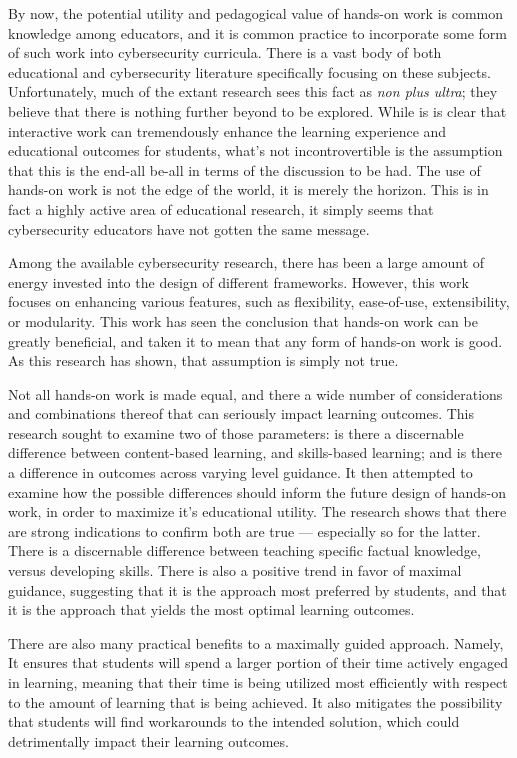 
By now, the potential utility and pedagogical value of hands-on work is common knowledge among educators, and it is common practice to incorporate some form of such work into cybersecurity curricula. %
There is a vast body of both educational and cybersecurity literature specifically focusing on these subjects. %
Unfortunately, much of the extant research sees this fact as \emph{non plus ultra}; %
they believe that there is nothing further beyond to be explored. %
While is is clear that interactive work can tremendously enhance the learning experience and educational outcomes for students, what's not incontrovertible is the assumption that this is the end-all be-all in terms of the discussion to be had. %
The use of hands-on work is not the edge of the world, it is merely the horizon. %
This is in fact a highly active area of educational research, it simply seems that cybersecurity educators have not gotten the same message. 

Among the available cybersecurity research, there has been a large amount of energy invested into the design of different frameworks. %
However, this work focuses on enhancing various features, such as flexibility, ease-of-use, extensibility, or modularity. %
This work has seen the conclusion that hands-on work can be greatly beneficial, and taken it to mean that any form of hands-on work is good. %
As this research has shown, that assumption is simply not true. 

Not all hands-on work is made equal, and there a wide number of considerations and combinations thereof that can seriously impact learning outcomes. %
This research sought to examine two of those parameters: is there a discernable difference between content-based learning, and skills-based learning; %
and is there a difference in outcomes across varying level guidance. %
It then attempted to examine how the possible differences should inform the future design of hands-on work, in order to maximize it's educational utility. %
The research shows that there are strong indications to confirm both are true ---%
 especially so for the latter. %
There is a discernable difference between teaching specific factual knowledge, versus developing skills. %
There is also a positive trend in favor of maximal guidance, suggesting that it is the approach most preferred by students, and that it is the approach that yields the most optimal learning outcomes. 

There are also many practical benefits to a maximally guided approach. %
Namely, It ensures that students will spend a larger portion of their time actively engaged in learning, meaning that their time is being utilized most efficiently with respect to the amount of learning that is being achieved. %
It also mitigates the possibility that students will find workarounds to the intended solution, which could detrimentally impact their learning outcomes. 


